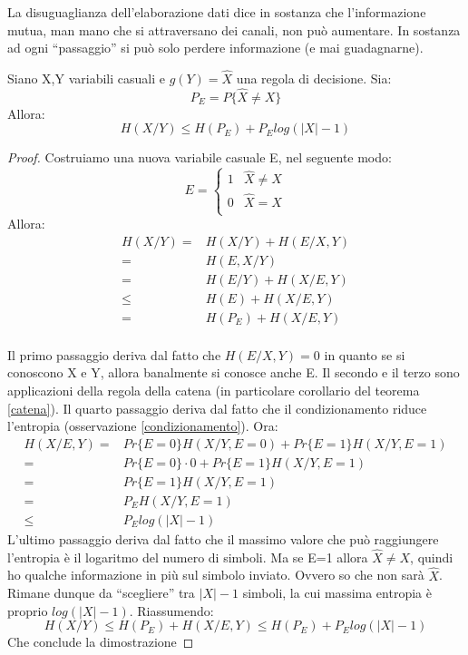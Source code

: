 \medskip

La disuguaglianza dell'elaborazione dati dice in sostanza che l'informazione mutua, man mano che si attraversano dei canali, 
non può aumentare. In sostanza ad ogni ``passaggio'' si può solo perdere informazione (e mai guadagnarne).

\bigskip

\begin{teorema}
\mbox{}

Siano X,Y variabili casuali e $g(Y)=\widehat{X}$ una regola di decisione. Sia:
\[
 P_E=P\{\widehat{X} \neq X\}
\]
Allora:
\[
 H(X/Y) \le H(P_E)+P_E log(|X|-1)
\]
\begin{proof}
\mbox{}

 Costruiamo una nuova variabile casuale E, nel seguente modo:
 \[
  E=
  \begin{cases}
    1 & \widehat{X} \neq X \\
    0 & \widehat{X}=X \\
  \end{cases}
 \]
 Allora:
 \[\begin{split}
   H(X/Y)=&H(X/Y)+H(E/X,Y) \\
         =&H(E,X/Y) \\
         =&H(E/Y)+H(X/E,Y) \\
         \le & H(E) + H(X/E,Y) \\
         = & H(P_E) + H(X/E,Y) \\
   \end{split}
 \]

Il primo passaggio deriva dal fatto che $H(E/X,Y)=0$ in quanto se si conoscono X e Y, allora banalmente si conosce anche E. 
Il secondo e il terzo sono applicazioni 
della regola della catena (in particolare corollario del teorema \ref{catena}). Il quarto passaggio 
deriva dal fatto che il condizionamento riduce l'entropia (osservazione \ref{condizionamento}).
Ora:
\[\begin{split}
 H(X/E,Y) =&Pr\{E=0\}H(X/Y,E=0)+
           Pr\{E=1\}H(X/Y,E=1) \\
          =&Pr\{E=0\} \cdot 0 + Pr\{E=1\}H(X/Y,E=1) \\
          =&Pr\{E=1\}H(X/Y,E=1) \\
          =&P_E H(X/Y,E=1) \\
          \le& P_E log(|X|-1)
  \end{split}
\]
L'ultimo passaggio deriva dal fatto che il massimo valore che può raggiungere l'entropia è il logaritmo del 
numero di simboli. Ma se E=1 allora $\widehat{X}\neq X$, quindi ho qualche informazione in più sul simbolo inviato. 
Ovvero so che non sarà $\widehat{X}$. Rimane dunque da ``scegliere'' tra $|X|-1$ simboli, la cui massima entropia è proprio 
$log(|X|-1)$.
Riassumendo:
\[
 H(X/Y) \le H(P_E) + H(X/E,Y) \le H(P_E)+P_E log(|X|-1)
\]
Che conclude la dimostrazione
\end{proof}
\end{teorema}

